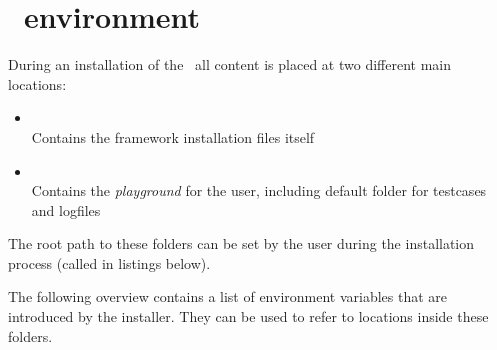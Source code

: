 %
%
%

\chapter{\rfw\ environment}

During an installation of the \rfw\ all content is placed at two different main locations:

\begin{itemize}
   \item {}\\
         Contains the framework installation files itself
   \item {}\\
         Contains the \textit{playground} for the user, including default folder for testcases and logfiles
\end{itemize}

The root path to these folders can be set by the user during the installation process (called  in listings below).

The following overview contains a list of environment variables that are introduced by the installer. They can be used
to refer to locations inside these folders.

